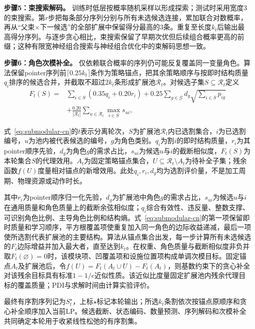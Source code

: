 \documentclass[final,5p,times,twocolumn]{elsarticle}
\begin{document}
\noindent\textbf{步骤5：束搜索解码。} 训练时低层按概率随机采样以形成探索；测试时采用宽度3的束搜索。第$r$步把每条部分序列分别与所有未选候选连接，累加联合对数概率，再从“父束$\times$下一候选”的全部扩展中保留得分最高的3条。重复至长度$k_t$后输出最高得分序列。与逐步贪心相比，束搜索保留了早期次优但后续组合概率更高的前缀；这种有限宽神经组合搜索与神经组合优化中的束解码思想一致\citep{choo2022beam}。

\noindent\textbf{步骤6：角色次模补全。} 仅依赖联合概率的序列仍可能反复覆盖同一变量角色。算法保留pointer序列前$\lceil0.25k_t\rceil$条作为策略锚点，把其余策略顺序与按即时结构质量$q_i$排序的候选合并，并截取不超过$2k_t$条形成扩展池$\mathcal R_t$。对候选子集$S\subseteq\mathcal R_t$定义
\begin{equation}
\begin{aligned}
F_t(S)={}&\sum_{i\in S}(0.35q_i+0.20r_i)
+0.25\sum_{g\in\mathcal G}d_g\sqrt{\sum_{i\in S}p_{ig}}\\
&+\frac{0.20}{|\mathcal R_t|}\sum_{u\in\mathcal R_t}\max_{i\in S}s_{ui},
\end{aligned}
\label{eq:submodular-cn}
\end{equation}

式~\eqref{eq:submodular-cn}的$t$表示分离轮次，$S$为扩展池$\mathcal R_t$内已选割集合，$i$为已选割编号，$u$为池内被代表候选的编号，$g$为角色类别。$q_i$为割$i$的即时结构质量，$r_i$为其pointer顺序先验，$d_g$为角色$g$的需求占比，$s_{ui}$为候选$u$与$i$的截断相似度，$F_t(S)$为本轮集合$S$的代理效用。$A_t$为固定策略锚点集合，$U\subseteq\mathcal R_t\setminus A_t$为待补全子集；残余函数$f(U)$度量相对锚点的新增效用。此处$q_i,r_i,d_g$均为选割评价量，不是加工周期、物理资源或动作时长。


其中$r_i$为pointer顺序归一化先验，$d_g$为扩展池中角色$g$的需求占比，$s_{ui}$为候选$u$与$i$在通用质量和角色质量上的截断余弦相似度；$q_i$综合有效性、违反量、整数支撑、可识别角色比例、主导角色比例和结构熵。式~\eqref{eq:submodular-cn}的第一项保留即时质量和学习顺序，平方根覆盖项使重复加入同一角色的边际收益递减，最后一项使所选割代表扩展池的主要结构。算法从锚点集合出发，每一步计算所有未选候选的$F_t$边际增益并加入最大者，直至达到$k_t$。在权重、角色质量与截断相似度非负并取$F_t(\varnothing)=0$时，该模块项、凹覆盖项和设施位置项构成单调次模目标。固定锚点$A_t$及扩展池后，令$f(U)=F_t(A_t\cup U)-F_t(A_t)$，则基数约束下的贪心补全对该残余目标具有标准$1-1/e$近似性质\citep{nemhauser1978analysis}。该近似比度量固定扩展池内残余代理目标的覆盖质量；PDI与求解时间由计算实验评价。

最终有序割序列记为$S_t^\star$，上标$\star$标记本轮输出；所选$k_t$条割依次按锚点原顺序和贪心补全顺序加入当前LP。候选截断、状态编码、数量预测、序列解码和次模补全共同确定本轮用于收紧线性松弛的有序割集。
\end{document}
